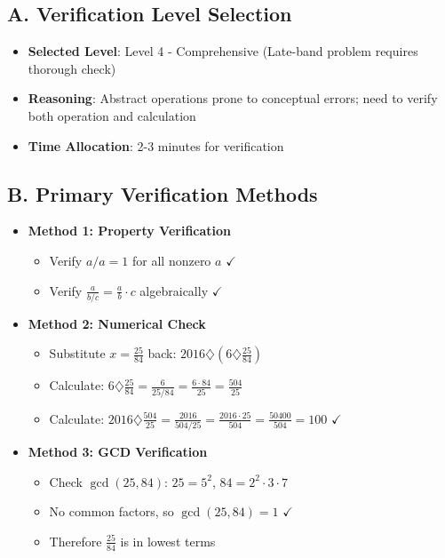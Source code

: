 \documentclass[11pt]{article}
\begin{document}
\begin{verificationbox}
\subsection*{A. Verification Level Selection}
\begin{itemize}[leftmargin=*]
    \item \textbf{Selected Level}: Level 4 - Comprehensive (Late-band problem requires thorough check)
    \item \textbf{Reasoning}: Abstract operations prone to conceptual errors; need to verify both operation and calculation
    \item \textbf{Time Allocation}: 2-3 minutes for verification
\end{itemize}

\subsection*{B. Primary Verification Methods}
\begin{itemize}[leftmargin=*]
    \item \textbf{Method 1: Property Verification}
    \begin{itemize}
        \item Verify $a/a = 1$ for all nonzero $a$ $\checkmark$
        \item Verify $\frac{a}{b/c} = \frac{a}{b} \cdot c$ algebraically $\checkmark$
    \end{itemize}
    
    \item \textbf{Method 2: Numerical Check}
    \begin{itemize}
        \item Substitute $x = \frac{25}{84}$ back: $2016 \diamondsuit (6 \diamondsuit \frac{25}{84})$
        \item Calculate: $6 \diamondsuit \frac{25}{84} = \frac{6}{25/84} = \frac{6 \cdot 84}{25} = \frac{504}{25}$
        \item Calculate: $2016 \diamondsuit \frac{504}{25} = \frac{2016}{504/25} = \frac{2016 \cdot 25}{504} = \frac{50400}{504} = 100$ $\checkmark$
    \end{itemize}
    
    \item \textbf{Method 3: GCD Verification}
    \begin{itemize}
        \item Check $\gcd(25, 84)$: $25 = 5^2$, $84 = 2^2 \cdot 3 \cdot 7$
        \item No common factors, so $\gcd(25, 84) = 1$ $\checkmark$
        \item Therefore $\frac{25}{84}$ is in lowest terms
    \end{itemize}
\end{itemize}


\end{verificationbox}
\end{document}
